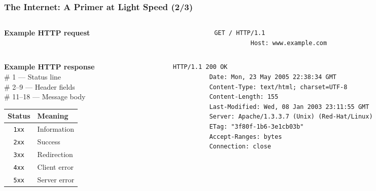 \documentclass[10pt, aspectratio=1610, natbib, handout]{beamer}
\begin{document}
  \begin{frame}[fragile]
    \frametitle{The Internet: A Primer at Light Speed (2/3)}

    \begin{columns}
      \begin{column}{0.35\textwidth}
        \textbf{Example HTTP request}
      \end{column}
      \begin{column}{0.60\textwidth}
        \begin{lstlisting}[language=HTML]
          GET / HTTP/1.1
          Host: www.example.com

        \end{lstlisting}
      \end{column}
    \end{columns}

    \vfill\pause

    \begin{columns}
      \begin{column}{0.35\textwidth}
        \textbf{Example HTTP response} \\
        \# 1      --- Status line   \\
        \# 2--9   --- Header fields \\
        \# 11--18 --- Message body

        \vspace{1em}

        \begin{table}
          \centering
          \begin{tabular}{cl}
            \toprule
            Status       & Meaning      \\
            \midrule
            \texttt{1xx} & Information  \\
            \texttt{2xx} & Success      \\
            \texttt{3xx} & Redirection  \\
            \texttt{4xx} & Client error \\
            \texttt{5xx} & Server error \\
            \bottomrule
          \end{tabular}
        \end{table}
      \end{column}
      \begin{column}{0.60\textwidth}
        \begin{lstlisting}[language=HTML]
          HTTP/1.1 200 OK
          Date: Mon, 23 May 2005 22:38:34 GMT
          Content-Type: text/html; charset=UTF-8
          Content-Length: 155
          Last-Modified: Wed, 08 Jan 2003 23:11:55 GMT
          Server: Apache/1.3.3.7 (Unix) (Red-Hat/Linux)
          ETag: "3f80f-1b6-3e1cb03b"
          Accept-Ranges: bytes
          Connection: close


\end{lstlisting}
\end{column}
\end{columns}
\end{frame}
\end{document}
